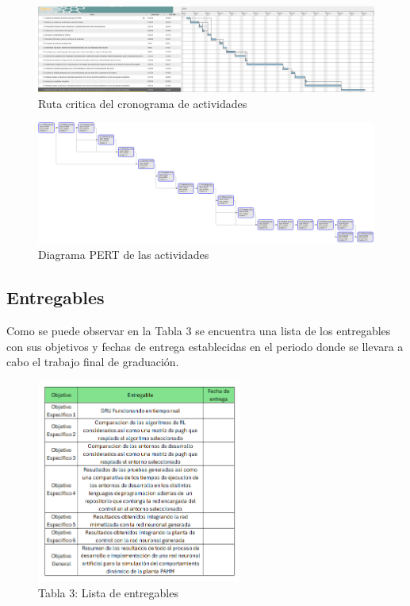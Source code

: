 \documentclass[12pt]{article}
\begin{document}
\begin{figure}
  \centering
  \includegraphics[scale=0.3, angle=90]{diagramas/gantt.png}
  \caption{Ruta critica del cronograma de actividades}
  \label{fig:gantt}
\end{figure}

\begin{figure}
  \centering
  \includegraphics[scale=0.3, angle=90]{diagramas/pert.png}
  \caption{Diagrama PERT de las actividades}
  \label{fig:pert}
\end{figure}


\subsection{Entregables}

Como se puede observar en la Tabla 3 se encuentra una lista de los entregables con sus objetivos y fechas de entrega establecidas en el periodo donde se llevara a cabo el trabajo final de graduación.

\begin{figure}[h]
  \centering
  \includegraphics[width=0.6\textwidth]{tablas/entregable.png}
  \captionsetup{labelformat=empty}  %
  \caption{Tabla 3: Lista de entregables}
\end{figure}
\end{document}
